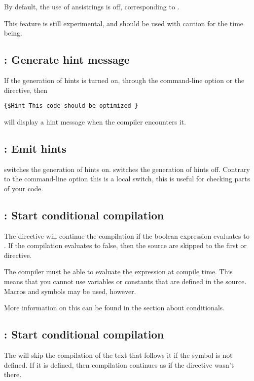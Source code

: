 \documentclass{report}
\begin{document}
By default, the use of ansistrings is off, corresponding to .

This feature is still experimental, and should be used with caution for the
time being.

\subsection{ : Generate hint message}

If the generation of hints is turned on, through the  command-line
option or the  directive, then
\begin{verbatim}
{$Hint This code should be optimized }
\end{verbatim}
will display a hint message when the compiler encounters it.

\subsection{ : Emit hints}

 switches the generation of hints on.
 switches the generation of hints off.
Contrary to the command-line option  this is a local switch,
this is useful for checking parts of your code.

\subsection{ : Start conditional compilation}

The directive  will continue the compilation
if the boolean expression  evaluates to . If the
compilation evaluates to false, then the source are skipped to the first
 or  directive.

The compiler must be able to evaluate the expression at compile time.
This means that you cannot use variables or constants that are defined in
the source. Macros and symbols may be used, however.

More information on this can be found in the section about
conditionals.

\subsection{ : Start conditional compilation}

The  will skip the compilation of the text that
follows it if the symbol  is not defined. If it is defined, then
compilation continues as if the directive wasn't there.
\end{document}

